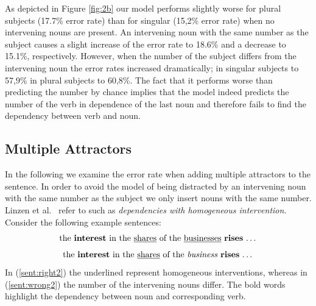 \documentclass[11pt,a4paper]{article}
\begin{document}
As depicted in Figure \ref{fig:2b} our model performs slightly worse for plural subjects (17.7\% error rate) than for singular (15,2\% error rate) when no intervening nouns are present. An intervening noun with the same number as the subject causes a slight increase of the error rate to 18.6\% and a decrease to 15.1\%, respectively. However, when the number of the subject differs from the intervening noun the error rates increased dramatically; in singular subjects to 57,9\% in plural subjects to 60,8\%. The fact that it performs worse than predicting the number by chance implies that the model indeed predicts the number of the verb in dependence of the last noun and therefore fails to find the dependency between verb and noun.

\subsection{Multiple Attractors}
\label{replication-attractors}

In the following we examine the error rate when adding multiple attractors to the sentence. In order to avoid the model of being distracted by an intervening noun with the same number as the subject we only insert nouns with the same number. Linzen et al.~\citep{Linzen2016} refer to such as  \textit{ dependencies with homogeneous intervention}. Consider the following example sentences:
\begin{equation}
	\label{sent:right2}
	\textnormal{the \textbf{interest} in the \underline{shares} of the \underline{businesses} \textbf{rises} \dots}
\end{equation}
\begin{equation}
	\label{sent:wrong2}
	\textnormal{the \textbf{interest} in the \underline{shares} of the \textit{business} \textbf{rises} \dots}
\end{equation}
In (\ref{sent:right2}) the underlined represent homogeneous interventions, whereas in (\ref{sent:wrong2}) the number of the intervening nouns differ. The bold words highlight the dependency between noun and corresponding verb.
\end{document}
